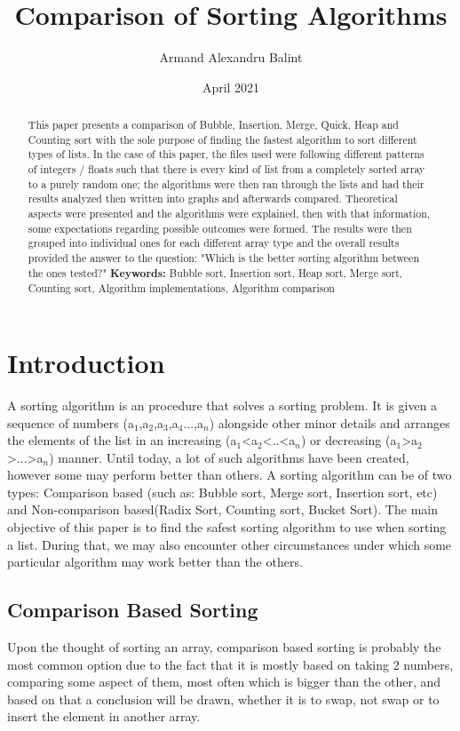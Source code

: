 \documentclass{article}
\title{Comparison of Sorting Algorithms}
\author{Armand Alexandru Balint\\}
\date{April 2021}
\begin{document}
\maketitle
\begin{abstract}
This paper presents a comparison of Bubble, Insertion, Merge, Quick, Heap and Counting sort with the sole purpose of finding the fastest algorithm to sort different types of lists. In the case of this paper, the files used were following different patterns of integers / floats such that there is every kind of list from a completely sorted array to a purely random one; the algorithms were then ran through the lists and had their results analyzed then written into graphs and afterwards compared. Theoretical aspects were presented and the algorithms were explained, then with that information, some expectations regarding possible outcomes were formed. The results were then grouped into individual ones for each different array type and the overall results provided the answer to the question: "Which is the better sorting algorithm between the ones tested?" \newline \newline \textbf{Keywords:} \footnotesize Bubble sort, Insertion sort, Heap sort, Merge sort, Counting sort, Algorithm implementations, Algorithm comparison


\end{abstract}
\normalsize
\clearpage
\clearpage

\section{Introduction}
A sorting algorithm is an procedure that solves a sorting problem. It is given a sequence of numbers (a$_1$,a$_2$,a$_3$,a$_4$...,a$_n$) alongside other minor details and arranges the elements of the list in an increasing (a$_1$<a$_2$<..<a$_n$) or decreasing (a$_1$>a$_2$>...>a$_n$) manner. Until today, a lot of such algorithms have been created, however some may perform better than others. A sorting algorithm can be of two types: Comparison based (such as: Bubble sort, Merge sort, Insertion sort, etc) and Non-comparison based(Radix Sort, Counting sort, Bucket Sort). The main objective of this paper is to find the safest sorting algorithm to use when sorting a list. During that, we may also encounter other circumstances under which some particular algorithm may work better than the others.

\subsection{Comparison Based Sorting}
Upon the thought of sorting an array, comparison based sorting is probably the most common option due to the fact that it is mostly based on taking 2 numbers, comparing some aspect of them, most often which is bigger than the other, and based on that a conclusion will be drawn, whether it is to swap, not swap or to insert the element in another array.
\end{document}
